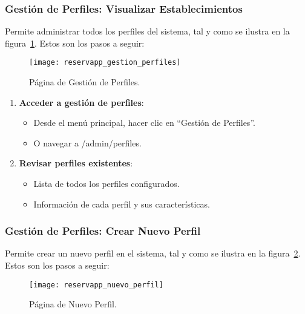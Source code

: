 \subsubsection{Gestión de Perfiles: Visualizar Establecimientos}
Permite administrar todos los perfiles del sistema, tal y como se ilustra en la figura~\ref{fig:reservapp_gestion_perfiles}. Estos son los pasos a seguir:

\begin{figure}[H]
	\centering
		\texttt{[image: reservapp\_gestion\_perfiles]}
	\caption{Página de Gestión de Perfiles.}
	\label{fig:reservapp_gestion_perfiles}
\end{figure}

\begin{enumerate}
   \item \textbf{Acceder a gestión de perfiles}:
   \begin{itemize}
      \item Desde el menú principal, hacer clic en ``Gestión de Perfiles''.
      \item O navegar a /admin/perfiles.
   \end{itemize}
   \item \textbf{Revisar perfiles existentes}:
   \begin{itemize}
      \item Lista de todos los perfiles configurados.
      \item Información de cada perfil y sus características.
   \end{itemize}
\end{enumerate}

\subsubsection{Gestión de Perfiles: Crear Nuevo Perfil}
Permite crear un nuevo perfil en el sistema, tal y como se ilustra en la figura~\ref{fig:reservapp_nuevo_perfil}. Estos son los pasos a seguir:

\begin{figure}[H]
	\centering
		\texttt{[image: reservapp\_nuevo\_perfil]}
	\caption{Página de Nuevo Perfil.}
	\label{fig:reservapp_nuevo_perfil}
\end{figure}


